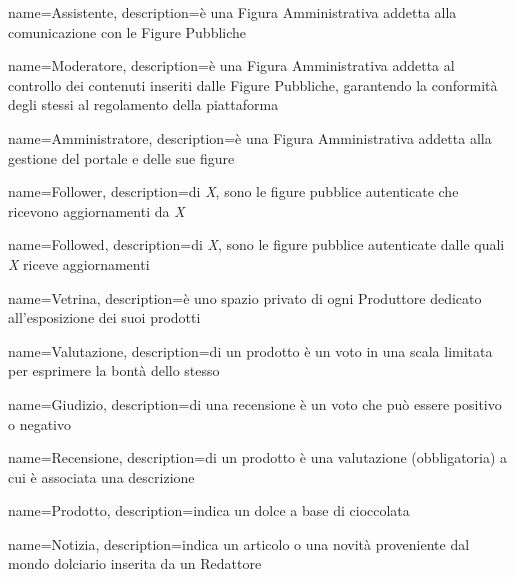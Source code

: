 {
    name={Assistente},
    description={è una Figura Amministrativa addetta alla comunicazione con le Figure Pubbliche}
}

{
    name={Moderatore},
    description={è una Figura Amministrativa addetta al controllo dei contenuti inseriti dalle Figure Pubbliche, garantendo la conformità degli stessi al regolamento della piattaforma}
}

{
    name={Amministratore},
    description={è una Figura Amministrativa addetta alla gestione del portale e delle sue figure}
}

{
    name={Follower},
    description={di \emph{X}, sono le figure pubblice autenticate che ricevono aggiornamenti da \emph{X}}
}

{
    name={Followed},
    description={di \emph{X}, sono le figure pubblice autenticate dalle quali \emph{X} riceve aggiornamenti}
}

{
    name={Vetrina},
    description={è uno spazio privato di ogni Produttore dedicato all'esposizione dei suoi prodotti}
}

{
    name={Valutazione},
    description={di un prodotto è un voto in una scala limitata per esprimere la bontà dello stesso}
}

{
    name={Giudizio},
    description={di una recensione è un voto che può essere positivo o negativo}
}

{
    name={Recensione},
    description={di un prodotto è una valutazione (obbligatoria) a cui è associata una descrizione}
}

{
    name={Prodotto},
    description={indica un dolce a base di cioccolata}
}

{
    name={Notizia},
    description={indica un articolo o una novità proveniente dal mondo dolciario inserita da un Redattore}
}







